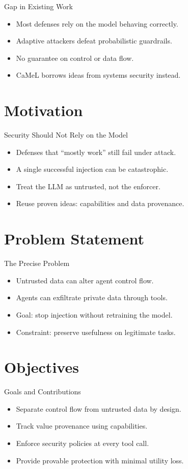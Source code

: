 \documentclass{beamer}
\begin{document}
\begin{frame}{Gap in Existing Work}
\begin{itemize}
\item Most defenses rely on the model behaving correctly.
\item Adaptive attackers defeat probabilistic guardrails.
\item No guarantee on control or data flow.
\item CaMeL borrows ideas from systems security instead.
\end{itemize}
\end{frame}

\section{Motivation}
\begin{frame}{Security Should Not Rely on the Model}
\begin{itemize}
\item Defenses that ``mostly work'' still fail under attack.
\item A single successful injection can be catastrophic.
\item Treat the LLM as untrusted, not the enforcer.
\item Reuse proven ideas: capabilities and data provenance.
\end{itemize}
\end{frame}

\section{Problem Statement}
\begin{frame}{The Precise Problem}
\begin{itemize}
\item Untrusted data can alter agent control flow.
\item Agents can exfiltrate private data through tools.
\item Goal: stop injection without retraining the model.
\item Constraint: preserve usefulness on legitimate tasks.
\end{itemize}
\end{frame}

\section{Objectives}
\begin{frame}{Goals and Contributions}
\begin{itemize}
\item Separate control flow from untrusted data by design.
\item Track value provenance using capabilities.
\item Enforce security policies at every tool call.
\item Provide provable protection with minimal utility loss.
\end{itemize}
\end{frame}
\end{document}
